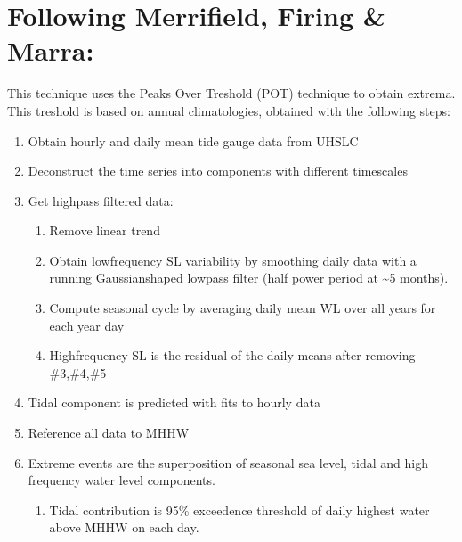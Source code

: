\documentclass[letterpaper,10pt,english]{jupyterBook}
\begin{document}
\chapter{Following Merrifield, Firing \& Marra:}
\label{\detokenize{notebooks/regional_and_local/SL_Components_intra-annual:following-merrifield-firing-marra}}
\sphinxAtStartPar
This technique uses the Peaks Over Treshold (POT) technique to obtain extrema. This treshold is based on annual climatologies, obtained with the following steps:
\begin{enumerate}
%
\item {} 
\sphinxAtStartPar
Obtain hourly and daily mean tide gauge data from UHSLC

\item {} 
\sphinxAtStartPar
Deconstruct the time series into components with different timescales

\item {} 
\sphinxAtStartPar
Get high\sphinxhyphen{}pass filtered data:
\begin{enumerate}
%
\item {} 
\sphinxAtStartPar
Remove linear trend

\item {} 
\sphinxAtStartPar
Obtain low\sphinxhyphen{}frequency SL variability by smoothing daily data with a running Gaussian\sphinxhyphen{}shaped low\sphinxhyphen{}pass filter (half power period at \textasciitilde{}5 months).

\item {} 
\sphinxAtStartPar
Compute seasonal cycle by averaging daily mean WL over all years for each year day

\item {} 
\sphinxAtStartPar
High\sphinxhyphen{}frequency SL is the residual of the daily means after removing \#3,\#4,\#5

\end{enumerate}

\item {} 
\sphinxAtStartPar
Tidal component is predicted with fits to hourly data

\item {} 
\sphinxAtStartPar
Reference all data to MHHW

\item {} 
\sphinxAtStartPar
Extreme events are the superposition of seasonal sea level, tidal and high frequency water level components.
\begin{enumerate}
%
\item {} 
\sphinxAtStartPar
Tidal contribution is 95\% exceedence threshold of daily highest water above MHHW on each day.


\end{enumerate}
\end{enumerate}
\end{document}
